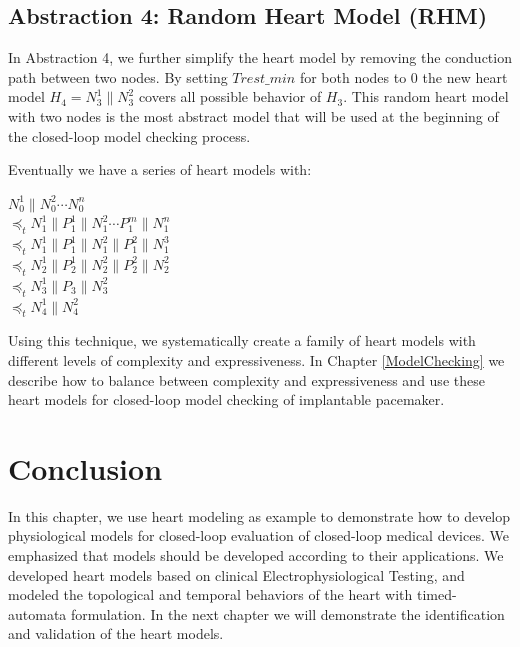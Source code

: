 \subsection{Abstraction 4: Random Heart Model (RHM)}
In Abstraction 4, we further simplify the heart model by removing the conduction path between two nodes. By setting $Trest\_min$ for both nodes to 0 the new heart model $H_4=N_3^1\|N_3^2$ covers all possible behavior of $H_3$. This random heart model with two nodes is the most abstract model that will be used at the beginning of the closed-loop model checking process.

Eventually we have a series of heart models with:

$N_0^1\|N_0^2\cdots N_0^n$\\
$\preceq_t N_1^1\|P_1^1\|N_1^2\cdots P_1^{m}\|N_1^n$\\
$\preceq_t N_1^1\| P_1^1 \| N_1^2\| P_1^2 \| N_1^3$\\
$\preceq_t N_2^1\| P_2^1\| N_2^2\| P_2^2\| N_2^2$\\
$\preceq_t N_3^1\| P_3\| N_3^2$\\
$\preceq_t N_4^1\| N_4^2$

Using this technique, we systematically create a family of heart models with different levels of complexity and expressiveness. In Chapter \ref{ModelChecking} we describe how to balance between complexity and expressiveness and use these heart models for closed-loop model checking of implantable pacemaker.
\section{Conclusion}
In this chapter, we use heart modeling as example to demonstrate how to develop physiological models for closed-loop evaluation of closed-loop medical devices. We emphasized that models should be developed according to their applications. We developed heart models based on clinical Electrophysiological Testing, and modeled the topological and temporal behaviors of the heart with timed-automata formulation. In the next chapter we will demonstrate the identification and validation of the heart models.


